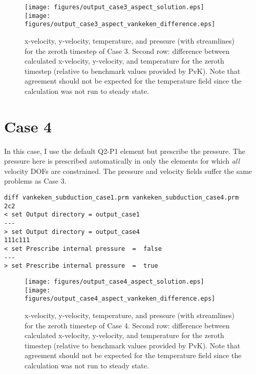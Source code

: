 \documentclass[11pt,letterpaper]{article}
\begin{document}
\begin{figure}[!htb]
\texttt{[image: figures/output\_case3\_aspect\_solution.eps]}\\
\texttt{[image: figures/output\_case3\_aspect\_vankeken\_difference.eps]}
\caption{x-velocity, y-velocity, temperature, and pressure (with streamlines) for the zeroth timestep of Case 3. Second row: difference between calculated x-velocity, y-velocity, and temperature for the zeroth timestep (relative to benchmark values provided by PvK). Note that agreement should not be expected for the temperature field since the calculation was not run to steady state.}
\end{figure}

\section{Case 4}
In this case, I use the default Q2-P1 element but prescribe the pressure. The pressure here is prescribed automatically in only the elements for which \emph{all} velocity DOFs are constrained. The pressure and velocity fields suffer the same problems as Case 3.

\begin{verbatim}
diff vankeken_subduction_case1.prm vankeken_subduction_case4.prm
2c2
< set Output directory = output_case1
---
> set Output directory = output_case4
111c111
< set Prescribe internal pressure  =  false
---
> set Prescribe internal pressure  =  true
\end{verbatim}

\begin{figure}[!htb]
\texttt{[image: figures/output\_case4\_aspect\_solution.eps]}\\
\texttt{[image: figures/output\_case4\_aspect\_vankeken\_difference.eps]}
\caption{x-velocity, y-velocity, temperature, and pressure (with streamlines) for the zeroth timestep of Case 4. Second row: difference between calculated x-velocity, y-velocity, and temperature for the zeroth timestep (relative to benchmark values provided by PvK). Note that agreement should not be expected for the temperature field since the calculation was not run to steady state.}
\end{figure}
\end{document}
